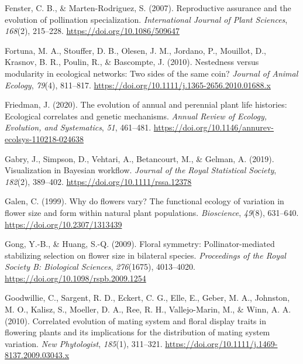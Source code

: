 \documentclass[
  12pt,
  a4paper,
]{article}
\newlength{\cslhangindent}
\newlength{\cslentryspacingunit} %
\newenvironment{CSLReferences}[2] %
 {%
  \setlength{\parindent}{0pt}
  \ifodd #1
  \let\oldpar\par
  \def\par{\hangindent=\cslhangindent\oldpar}
  \fi
  \setlength{\parskip}{#2\cslentryspacingunit}
 }%
 {}
\begin{document}
\begin{CSLReferences}{1}{0}
\leavevmode{}%
Fenster, C. B., \& Marten-Rodriguez, S. (2007). Reproductive assurance and the evolution of pollination specialization. \emph{International Journal of Plant Sciences}, \emph{168}(2), 215--228. \url{https://doi.org/10.1086/509647}

\leavevmode{}%
Fortuna, M. A., Stouffer, D. B., Olesen, J. M., Jordano, P., Mouillot, D., Krasnov, B. R., Poulin, R., \& Bascompte, J. (2010). Nestedness versus modularity in ecological networks: Two sides of the same coin? \emph{Journal of Animal Ecology}, \emph{79}(4), 811--817. \url{https://doi.org/10.1111/j.1365-2656.2010.01688.x}

\leavevmode{}%
Friedman, J. (2020). The evolution of annual and perennial plant life histories: Ecological correlates and genetic mechanisms. \emph{Annual Review of Ecology, Evolution, and Systematics}, \emph{51}, 461--481. \url{https://doi.org/10.1146/annurev-ecolsys-110218-024638}

\leavevmode{}%
Gabry, J., Simpson, D., Vehtari, A., Betancourt, M., \& Gelman, A. (2019). Visualization in {Bayesian} workflow. \emph{Journal of the Royal Statistical Society}, \emph{182}(2), 389--402. \url{https://doi.org/10.1111/rssa.12378}

\leavevmode{}%
Galen, C. (1999). Why do flowers vary? The functional ecology of variation in flower size and form within natural plant populations. \emph{Bioscience}, \emph{49}(8), 631--640. \url{https://doi.org/10.2307/1313439}

\leavevmode{}%
Gong, Y.-B., \& Huang, S.-Q. (2009). Floral symmetry: Pollinator-mediated stabilizing selection on flower size in bilateral species. \emph{Proceedings of the Royal Society B: Biological Sciences}, \emph{276}(1675), 4013--4020. \url{https://doi.org/10.1098/rspb.2009.1254}

\leavevmode{}%
Goodwillie, C., Sargent, R. D., Eckert, C. G., Elle, E., Geber, M. A., Johnston, M. O., Kalisz, S., Moeller, D. A., Ree, R. H., Vallejo-Marin, M., \& Winn, A. A. (2010). Correlated evolution of mating system and floral display traits in flowering plants and its implications for the distribution of mating system variation. \emph{New Phytologist}, \emph{185}(1), 311--321. \url{https://doi.org/10.1111/j.1469-8137.2009.03043.x}


\end{CSLReferences}
\end{document}
